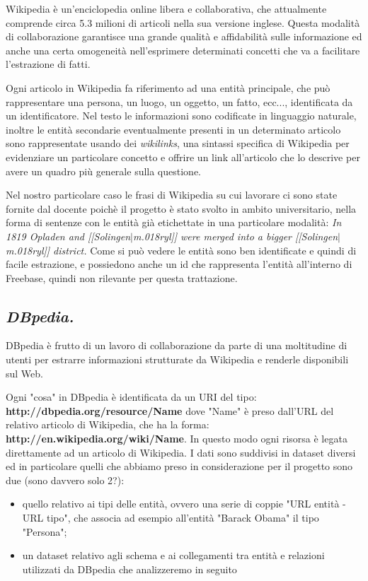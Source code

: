 \documentclass[10pt,a4paper,twocolumn]{article}
\begin{document}
Wikipedia è un'enciclopedia online libera e collaborativa, che attualmente comprende circa 5.3 milioni di articoli nella sua versione inglese. Questa modalità di collaborazione garantisce una grande qualità e affidabilità sulle informazione ed anche una certa omogeneità nell'esprimere determinati concetti che va a facilitare l'estrazione di fatti.
 
Ogni articolo in Wikipedia fa riferimento ad una entità principale, che può rappresentare una persona, un luogo, un oggetto, un fatto, ecc..., identificata da un identificatore. Nel testo le informazioni sono codificate in linguaggio naturale, inoltre le entità secondarie eventualmente presenti in un determinato articolo sono rappresentate usando dei \textit{wikilinks}, una sintassi specifica di Wikipedia per evidenziare un particolare concetto e offrire un link all'articolo che lo descrive per avere un quadro più generale sulla questione.

Nel nostro particolare caso le frasi di Wikipedia su cui lavorare ci sono state fornite dal docente poichè il progetto è stato svolto in ambito universitario, nella forma di sentenze con le entità già etichettate in una particolare modalità:
\bigbreak
\textit{In 1819 Opladen and [[Solingen$|$m.018ryl]] were merged into a bigger [[Solingen$|$m.018ryl]] district.}
\bigbreak
Come si può vedere le entità sono ben identificate e quindi di facile estrazione, e possiedono anche un id che rappresenta l'entità all'interno di Freebase, quindi non rilevante per questa trattazione.

\subsection*{\textit{DBpedia.}}

DBpedia è frutto di un lavoro di collaborazione da parte di una moltitudine di utenti per estrarre informazioni strutturate da Wikipedia e renderle disponibili sul Web.

Ogni "cosa" in DBpedia è identificata da un URI del tipo:
\bigbreak
\textbf{http://dbpedia.org/resource/Name}
\bigbreak
dove "Name" è preso dall'URL del relativo articolo di Wikipedia, che ha la forma:
\bigbreak
\textbf{http://en.wikipedia.org/wiki/Name}.
\bigbreak
In questo modo ogni risorsa è legata direttamente ad un articolo di Wikipedia. I dati sono suddivisi in dataset diversi ed in particolare quelli che abbiamo preso in considerazione per il progetto sono due (sono davvero solo 2?):
\begin{itemize}
\item quello relativo ai tipi delle entità, ovvero una serie di coppie "URL entità - URL tipo", che associa ad esempio all'entità "Barack Obama" il tipo "Persona";
\item un dataset relativo agli schema e ai collegamenti tra entità e relazioni utilizzati da DBpedia che analizzeremo in seguito
\end{itemize}
\end{document}
